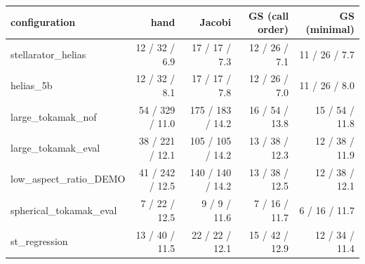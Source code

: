 \begin{tabular}{lrrrr}
\toprule
configuration & hand & Jacobi & GS (call order) & GS (minimal) \\
\midrule
stellarator\_helias & 12 / 32 / 6.9 & 17 / 17 / 7.3 & 12 / 26 / 7.1 & 11 / 26 / 7.7 \\
helias\_5b & 12 / 32 / 8.1 & 17 / 17 / 7.8 & 12 / 26 / 7.0 & 11 / 26 / 8.0 \\
large\_tokamak\_nof & 54 / 329 / 11.0 & 175 / 183 / 14.2 & 16 / 54 / 13.8 & 15 / 54 / 11.8 \\
large\_tokamak\_eval & 38 / 221 / 12.1 & 105 / 105 / 14.2 & 13 / 38 / 12.3 & 12 / 38 / 11.9 \\
low\_aspect\_ratio\_DEMO & 41 / 242 / 12.5 & 140 / 140 / 14.2 & 13 / 38 / 12.5 & 12 / 38 / 12.1 \\
spherical\_tokamak\_eval & 7 / 22 / 12.5 & 9 / 9 / 11.6 & 7 / 16 / 11.7 & 6 / 16 / 11.7 \\
st\_regression & 13 / 40 / 11.5 & 22 / 22 / 12.1 & 15 / 42 / 12.9 & 12 / 34 / 11.4 \\
\bottomrule
\end{tabular}

